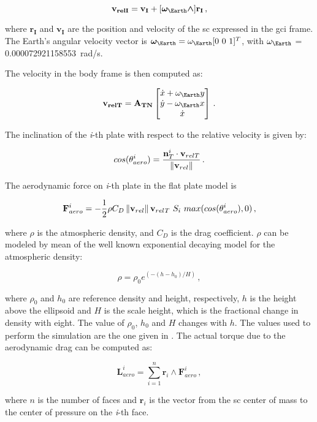 \begin{equation}
  \mathbf{v_{relI}} =  \mathbf{v_I} + [\boldsymbol{\omega_{\Earth} \wedge}] \mathbf{r_I} \,,
\end{equation}

where $\mathbf{r_I}$ and $\mathbf{v_I}$ are the position and velocity of the \acrshort{sc} expressed in the \acrshort{gci} frame.
The Earth's angular velocity vector is $\boldsymbol{\omega_{\Earth}} = \omega_{\Earth}[0 \ 0 \ 1]^T$, with $\omega_{\Earth}$ = \SI{0.000072921158553}{\radian/\second}.

The velocity in the body frame is then computed as:

\begin{equation}
  \mathbf{v_{relT}} = \mathbf{A_{TN}}   \begin{bmatrix} \dot{x} + \omega_{\Earth} y \\ \dot{y} - \omega_{\Earth} x \\ \dot{x} \end{bmatrix} \,.
\end{equation}

The inclination of the \textit{i}-th plate with respect to the relative velocity is given by:

\begin{equation}
  cos(\theta_{aero}^{i}) = \frac{\mathbf{n}_{T}^{i} \cdot \mathbf{v}_{relT}}{\left\lVert\mathbf{v}_{rel}\right\rVert} \,.
\end{equation}

The aerodynamic force on \textit{i}-th plate in the flat plate model is

\begin{equation}
  \mathbf{F}_{aero}^{i} = - \frac{1}{2} \rho C_{D} \norm{\mathbf{v}_{rel}} \mathbf{v}_{rel_{} T}\ S_{i}\ max(cos(\theta_{aero}^{i}),0) \,,
\end{equation}

where $\rho$ is the atmospheric density, and $C_D$ is the drag coefficient.
$\rho$ can be modeled by mean of the well known exponential decaying model for the atmospheric density:

\begin{equation}
  \rho = \rho_{0} e^{(-(h-h_{0})/H)} \,,
\end{equation}

where $\rho_{0}$ and $h_{0}$ are reference density and height, respectively, $h$ is the height above the ellipsoid and $H$ is the scale height, which is the fractional change in density with eight.
The value of $\rho_{0}$, $h_{0}$  and $H$ changes with $h$.
The values used to perform the simulation are the one given in \cite{Markley2014}.
The actual torque due to the aerodynamic drag can be computed as:

\begin{equation}
  \mathbf{L}_{aero}^{i} = \sum\limits_{i=1}^n  \mathbf{r}_{i} \wedge \mathbf{F}_{aero}^{i} \,,
\end{equation}

where $n$ is the number of faces and $\mathbf{r}_{i}$ is the vector from the \acrshort{sc} center of mass to the center of pressure on the \textit{i}-th face.
